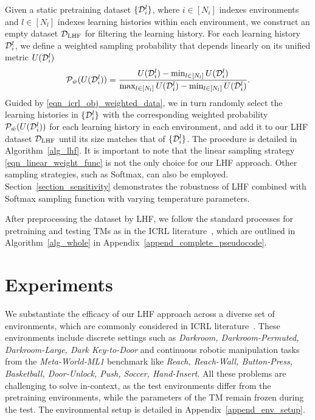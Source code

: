 \documentclass{article}
\begin{document}
Given a static pretraining dataset $\{{\mathcal D}_i^l\}$, where $i \in [N_i]$ indexes environments and $l \in [N_l]$ indexes learning histories within each environment, we construct an empty dataset ${\mathcal D}_{\text{LHF}}$ for filtering the learning history. For each learning history ${\mathcal D}_i^l$, we define a weighted sampling probability that depends linearly on its unified metric $U({\mathcal D}_i^l)$
%
\begin{align}\label{eqn_linear_weight_func}
    \mathcal{P}_{\bar{w}}(U({\mathcal D}_i^l)) = \frac{U({\mathcal D}_i^l) - \min_{l \in [N_l]} U({\mathcal D}_i^l)}{\max_{l \in [N_l]} U({\mathcal D}_i^l) - \min_{l \in [N_l]} U({\mathcal D}_i^l)}.
\end{align}
%
%
Guided by \eqref{eqn_icrl_obj_weighted_data}, we in turn randomly select the learning histories in $\{{\mathcal D}_i^l\}$ with the corresponding weighted probability $\mathcal{P}_{\bar{w}}(U({\mathcal D}_i^l))$ for each learning history in each environment, and add it to our LHF dataset ${\mathcal D}_\text{LHF}$ until its size matches that of $\{{\mathcal D}_i^l\}$. The procedure is detailed in Algorithm~\ref{alg_lhf}.
%
%
It is important to note that the linear sampling strategy \eqref{eqn_linear_weight_func} is not the only choice for our LHF approach. Other sampling strategies, such as Softmax, can also be employed. Section~\ref{section_sensitivity} demonstrates the robustness of LHF combined with Softmax sampling function with varying temperature parameters.


After preprocessing the dataset by LHF, we follow the standard processes for pretraining and testing TMs as in the ICRL literature~\cite{laskin2022context, lee2024supervised, chen2025random}, which are outlined in Algorithm~\ref{alg_whole} in Appendix~\ref{append_complete_pseudocode}.





\section{Experiments}
\label{section_experiment}


We substantiate the efficacy of our LHF approach across a diverse set of environments, which are commonly considered in ICRL literature~\citep{laskin2022context, lee2024supervised, son2025distilling, chen2025random}.
%
These environments include discrete settings such as \textit{Darkroom, Darkroom-Permuted, Darkroom-Large, Dark Key-to-Door} and continuous robotic manipulation tasks from the \textit{Meta-World-ML1} benchmark like \textit{Reach, Reach-Wall, Button-Press, Basketball, Door-Unlock, Push, Soccer, Hand-Insert}.
%
All these problems are challenging to solve in-context, as the test environments differ from the pretraining environments, while the parameters of the TM remain frozen during the test. The environmental setup is detailed in Appendix~\ref{append_env_setup}.
\end{document}
